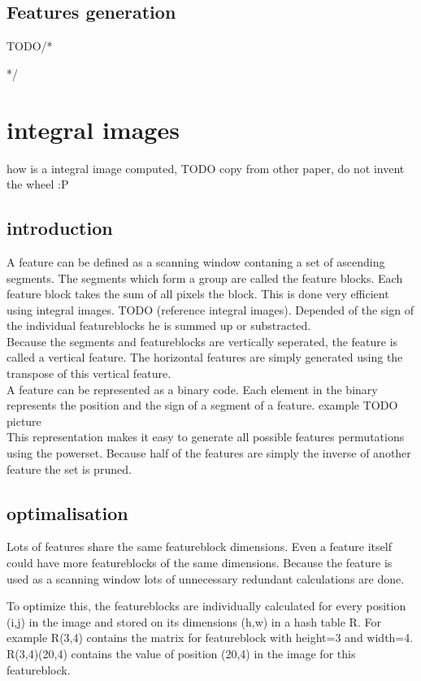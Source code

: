 \documentclass[a4paper,11pt]{article}
\begin{document}
\subsection{Features generation}
TODO/*{{{*/
\section*{integral images}
how is a integral image computed, TODO copy from other paper, do not invent the
wheel :P

	\subsection{introduction}
	A feature can be defined as a scanning window contaning a set of ascending
	segments. The segments which form a group are called the feature blocks. Each
	feature block takes the sum of all pixels the block. This is done very
	efficient using integral images.  TODO (reference integral images). Depended
	of the sign of the individual featureblocks he is summed up or substracted.\\ 

	Because the segments and featureblocks are vertically seperated, the
	feature is called a vertical feature.  The horizontal features are simply
	generated using the transpose of this vertical feature.\\

	A feature can be represented as a binary code. Each element in the binary
	represents the position and the sign of a segment of a feature.
	example TODO picture\\

	This representation makes it easy to generate all possible features
	permutations using the powerset.  Because half of the features are simply
	the inverse of another feature the set is pruned.

	\subsection{optimalisation}
	Lots of features share the same featureblock dimensions. Even a feature
	itself could have more featureblocks of the same dimensions.  Because the
	feature is used as a scanning window lots of unnecessary redundant
	calculations are done.

	To optimize this, the featureblocks are individually calculated for every
	position (i,j) in the image and stored on its dimensions (h,w) in a hash
	table R.  For example R(3,4) contains the matrix for featureblock with
	height=3 and width=4.  R(3,4)(20,4) contains the value of position (20,4) in
	the image for this featureblock.

}}}
\end{document}
